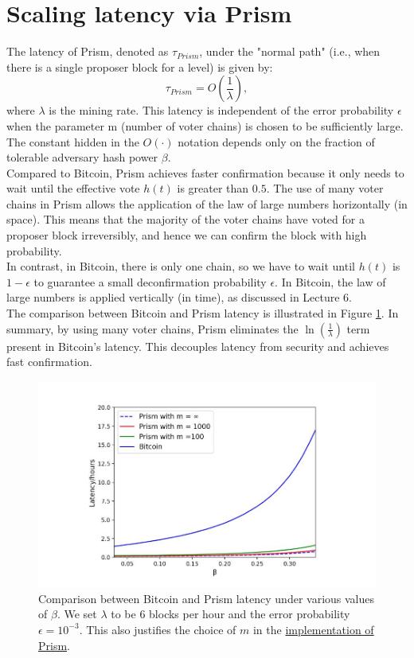 \section{Scaling latency via Prism}
The latency of Prism, denoted as $\tau_{Prism}$, under the "normal path" (i.e., when there is a single proposer block for a level) is given by:\\
\begin{equation*}
    \tau_{Prism} = O(\frac{1}{\lambda}),
\end{equation*}
where $\lambda$ is the mining rate. This latency is independent of the error probability $\epsilon$ when the parameter m (number of voter chains) is chosen to be sufficiently large. The constant hidden in the $O(·)$ notation depends only on the fraction of tolerable adversary hash power $\beta$.\\
Compared to Bitcoin, Prism achieves faster confirmation because it only needs to wait until the effective vote $h(t)$ is greater than $0.5$. The use of many voter chains in Prism allows the application of the law of large numbers horizontally (in space). This means that the majority of the voter chains have voted for a proposer block irreversibly, and hence we can confirm the block with high probability.\\
In contrast, in Bitcoin, there is only one chain, so we have to wait until $h(t)$ is $1 - \epsilon$ to guarantee a small deconfirmation probability $\epsilon$. In Bitcoin, the law of large numbers is applied vertically (in time), as discussed in Lecture 6.\\
The comparison between Bitcoin and Prism latency is illustrated in Figure \ref{fig:f6}. In summary, by using many voter chains, Prism eliminates the $\ln(\frac{1}{\lambda})$ term present in Bitcoin's latency. This decouples latency from security and achieves fast confirmation.
\begin{center}
    \begin{figure}
        \centering
        \includegraphics[width=0.8\linewidth]{Fig/09/F6}
        \caption{Comparison between Bitcoin and Prism latency under various values of $\beta$. We set $\lambda$ to be 6 blocks per hour and the error probability $\epsilon = 10^{−3}$. This also justifies the choice of $m$ in the \href{https://arxiv.org/abs/1909.11261}{implementation of Prism}.}
        \label{fig:f6}
    \end{figure}
\end{center}